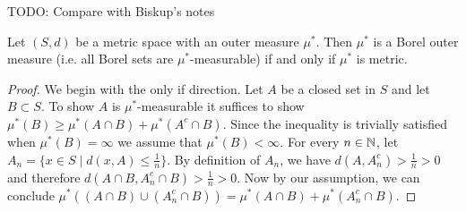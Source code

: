 TODO: Compare with Biskup's notes
\begin{lem}\label{CaratheodoryCriterion}Let $(S,d)$ be a metric space with an outer measure $\mu^*$.
  Then $\mu^*$ is a Borel outer measure (i.e. all Borel sets are
  $\mu^*$-measurable) if and only if $\mu^*$ is metric.
\end{lem}
\begin{proof}
We begin with the only if direction.  Let $A$ be a closed set in $S$
and let $B \subset S$.  To show $A$ is $\mu^*$-measurable it suffices
to show $\mu^*(B) \geq \mu^*(A \cap B) + \mu^*(A^c \cap B)$.  Since
the inequality is trivially satisfied when $\mu^*(B) = \infty$ we
assume that $\mu^*(B) < \infty$.  For
every $n \in \mathbb{N}$, let $A_n =
\lbrace x \in S \mid d(x, A) \leq \frac{1}{n} \rbrace$.  By definition
of $A_n$, we have $d(A,
A_n^c) > \frac{1}{n} > 0$ and therefore $d(A \cap B, A_n^c \cap B)
> \frac{1}{n} > 0$.  Now by our assumption, we can conclude $\mu^*((A
\cap B) \cup (A_n^c \cap B)) = \mu^*(A \cap B) +
\mu^*(A_n^c \cap B)$.


\end{proof}
